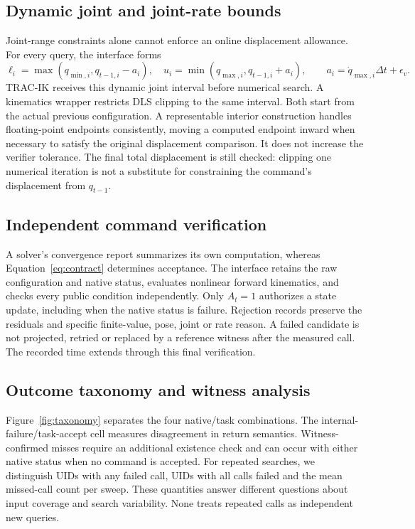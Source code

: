 \documentclass[10pt,a4paper]{article}
\begin{document}
\subsection{Dynamic joint and joint-rate bounds}

Joint-range constraints alone cannot enforce an online displacement allowance.
For every query, the interface forms
\begin{equation}
 \ell_i=\max(q_{\min,i},q_{t-1,i}-a_i),\quad
 u_i=\min(q_{\max,i},q_{t-1,i}+a_i),\qquad
 a_i=\dot q_{\max,i}\Delta t+\epsilon_v .
\label{eq:dynamic}
\end{equation}
TRAC-IK receives this dynamic joint interval before numerical search.
A kinematics wrapper restricts DLS clipping to the same interval.
Both start from the actual previous configuration.
A representable interior construction handles floating-point endpoints
consistently, moving a computed endpoint inward when necessary to satisfy the
original displacement comparison. It does not increase the verifier tolerance.
The final total displacement is still checked: clipping one numerical iteration
is not a substitute for constraining the command's displacement from $q_{t-1}$.

\subsection{Independent command verification}

A solver's convergence report summarizes its own computation, whereas
Equation~\eqref{eq:contract} determines acceptance.
The interface retains the raw configuration and native status, evaluates
nonlinear forward kinematics, and checks every public condition independently.
Only $A_t=1$ authorizes a state update, including when the native status is
failure. Rejection records preserve the residuals and specific finite-value,
pose, joint or rate reason. A failed candidate is not projected, retried or
replaced by a reference witness after the measured call.
The recorded time extends through this final verification.

\subsection{Outcome taxonomy and witness analysis}

Figure~\ref{fig:taxonomy} separates the four native/task combinations.
The internal-failure/task-accept cell measures disagreement in return semantics.
Witness-confirmed misses require an additional existence check and can occur
with either native status when no command is accepted.
For repeated searches, we distinguish UIDs with any failed call, UIDs with all
calls failed and the mean missed-call count per sweep.
These quantities answer different questions about input coverage and search
variability. None treats repeated calls as independent new queries.
\end{document}
